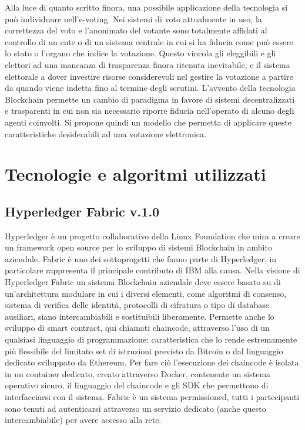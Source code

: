 Alla luce di quanto scritto finora, una possibile applicazione della tecnologia si può individuare nell'e-voting. Nei sistemi di voto attualmente in uso, la correttezza del voto e l’anonimato del votante sono totalmente affidati al controllo di un ente o di un sistema centrale in cui si ha fiducia come può essere lo stato o l'organo che indice la votazione. Questo vincola gli eleggibili e gli elettori ad una mancanza di trasparenza finora ritenuta inevitabile, e il sistema elettorale a dover investire risorse considerevoli nel gestire la votazione a partire da quando viene indetta fino al termine degli scrutini. L’avvento della tecnologia Blockchain permette un cambio di paradigma in favore di sistemi decentralizzati e trasparenti in cui non sia necessario riporre fiducia nell’operato di alcuno degli agenti coinvolti. Si propone quindi un modello che permetta di applicare queste caratteristiche desiderabili ad una votazione elettronica.

\section{Tecnologie e algoritmi utilizzati}
	\subsection{Hyperledger Fabric v.1.0} \label{sec:Hyperledger}
		Hyperledger è un progetto collaborativo della Linux Foundation che mira a creare un framework open source per lo sviluppo di sistemi Blockchain in ambito aziendale. Fabric è uno dei sottoprogetti che fanno parte di Hyperledger, in particolare rappresenta il principale contributo di IBM alla causa. Nella visione di Hyperledger Fabric un sistema Blockchain aziendale deve essere basato su di un'architettura modulare in cui i diversi elementi, come algoritmi di consenso, sistema di verifica delle identità, protocolli di cifratura o tipo di database ausiliari, siano intercambiabili e sostituibili liberamente. Permette anche lo sviluppo di smart contract, qui chiamati chaincode, attraverso l'uso di un qualsiasi linguaggio di programmazione: caratteristica che lo rende estremamente più flessibile del limitato set di istruzioni previsto da Bitcoin o dal linguaggio dedicato sviluppato da Ethereum. Per fare ciò l'esecuzione dei chaincode è isolata in un container dedicato, creato attraverso Docker, contenente un sistema operativo sicuro, il linguaggio del chaincode e gli SDK che permettono di interfacciarsi con il sistema. Fabric è un sistema permissioned, tutti i partecipanti sono tenuti ad autenticarsi attraverso un servizio dedicato (anche questo intercambiabile) per avere accesso alla rete. 
